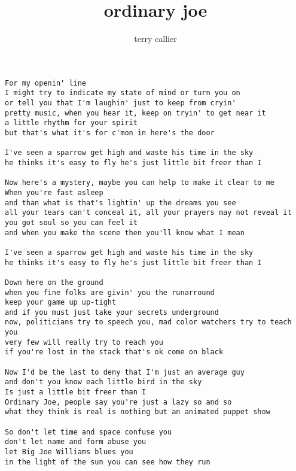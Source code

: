 \author{terry callier}
\title{ordinary joe}
\maketitle
{\small
\begin{verbatim}
For my openin' line
I might try to indicate my state of mind or turn you on
or tell you that I'm laughin' just to keep from cryin'
pretty music, when you hear it, keep on tryin' to get near it
a little rhythm for your spirit
but that's what it's for c'mon in here's the door

I've seen a sparrow get high and waste his time in the sky
he thinks it's easy to fly he's just little bit freer than I

Now here's a mystery, maybe you can help to make it clear to me
When you're fast asleep
and than what is that's lightin' up the dreams you see
all your tears can't conceal it, all your prayers may not reveal it
you got soul so you can feel it
and when you make the scene then you'll know what I mean

I've seen a sparrow get high and waste his time in the sky
he thinks it's easy to fly he's just little bit freer than I

Down here on the ground
when you fine folks are givin' you the runarround
keep your game up up-tight
and if you must just take your secrets underground
now, politicians try to speech you, mad color watchers try to teach you
very few will really try to reach you
if you're lost in the stack that's ok come on black

Now I'd be the last to deny that I'm just an average guy
and don't you know each little bird in the sky
Is just a little bit freer than I
Ordinary Joe, people say you're just a lazy so and so
what they think is real is nothing but an animated puppet show

So don't let time and space confuse you
don't let name and form abuse you
let Big Joe Williams blues you
in the light of the sun you can see how they run
\end{verbatim}}